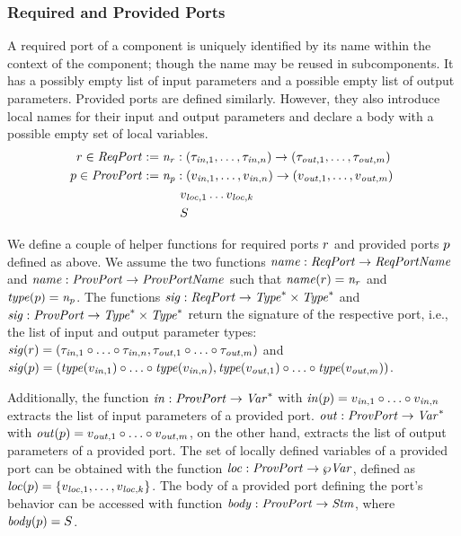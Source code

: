 \documentclass[a4paper,10pt,english]{article}
\begin{document}
\subsubsection{Required and Provided Ports}
A required port of a component is uniquely identified by its name within the context of the component; though the name may be
reused in subcomponents. It has a possibly empty list of input parameters and a possible empty list of output parameters. 
Provided ports are defined similarly. However, they also introduce local names for their input and output parameters and declare a
body with a possible empty set of local variables. 
\begin{align*}
	r \in \mathit{ReqPort} &:= \mathit{n_r} \; \mathtt{:} \; \mathtt{(} \tau_{\mathit{in}, 1}, \ldots, \tau_{\mathit{in}, n} \mathtt{) \rightarrow (} \tau_{\mathit{out},
	1}, \ldots, \tau_{\mathit{out}, m} \mathtt{)} \\
	p \in \mathit{ProvPort} &:= \mathit{n_p} \; \mathtt{:} \; \mathtt{(} v_{\mathit{in}, 1}, \ldots, v_{\mathit{in}, n} \mathtt{) \rightarrow (} v_{\mathit{out}, 1}, \ldots, v_{\mathit{out}, m} \mathtt{)} \; \\&\qquad\quad v_{\mathit{loc}, 1} \ldots v_{\mathit{loc}, k} \\&\qquad\quad S
\end{align*}

We define a couple of helper functions for required ports $r$ and provided ports $p$ defined as above. We assume
the two functions $\mathit{name} : \mathit{ReqPort} \rightarrow \mathit{ReqPortName}$ and $\mathit{name} : \mathit{ProvPort} \rightarrow \mathit{ProvPortName}$ such that
$\mathit{name}(r) = \mathit{n_r}$ and $\mathit{type}(p) = \mathit{n_p}$.
The functions $\mathit{sig} :
\mathit{ReqPort} \rightarrow \mathit{Type}^* \times \mathit{Type}^*$ and $\mathit{sig} : \mathit{ProvPort} \rightarrow \mathit{Type}^* \times
\mathit{Type}^*$ return the signature of the respective port, i.e., the list of input and output parameter types:
$\mathit{sig}(r) = (\tau_{\mathit{in}, 1} \circ \ldots \circ \tau_{\mathit{in}, n}, \tau_{\mathit{out}, 1} \circ \ldots
\circ \tau_{\mathit{out}, m})$ and $\mathit{sig}(p) = (\mathit{type}(v_{\mathit{in}, 1}) \circ \ldots \circ
\mathit{type}(v_{\mathit{in}, n}), \mathit{type}(v_{\mathit{out}, 1}) \circ \ldots \circ \mathit{type}(v_{\mathit{out}, m}))$.

Additionally, the function $\mathit{in} : \mathit{ProvPort} \rightarrow \mathit{Var}^*$ with $\mathit{in}(p) = v_{\mathit{in}, 1} \circ
\ldots \circ v_{\mathit{in}, n}$ extracts the list of input parameters of a provided port. $\mathit{out} : \mathit{ProvPort} \rightarrow
\mathit{Var}^*$ with $\mathit{out}(p) = v_{\mathit{out}, 1} \circ \ldots \circ v_{\mathit{out}, m}$, on the other hand,
extracts the list of output parameters of a provided port. The set of locally defined variables of a provided port can be obtained
with the function $\mathit{loc} : \mathit{ProvPort} \rightarrow
\wp \mathit{Var}$, defined as $\mathit{loc}(p) = \{v_{\mathit{loc}, 1}, \ldots, v_{\mathit{loc}, k}\}$. The body of a
provided port defining the port's behavior can be accessed with function $\mathit{body} : \mathit{ProvPort} \rightarrow \mathit{Stm}$, where
$\mathit{body}(p) = S$.
\end{document}
